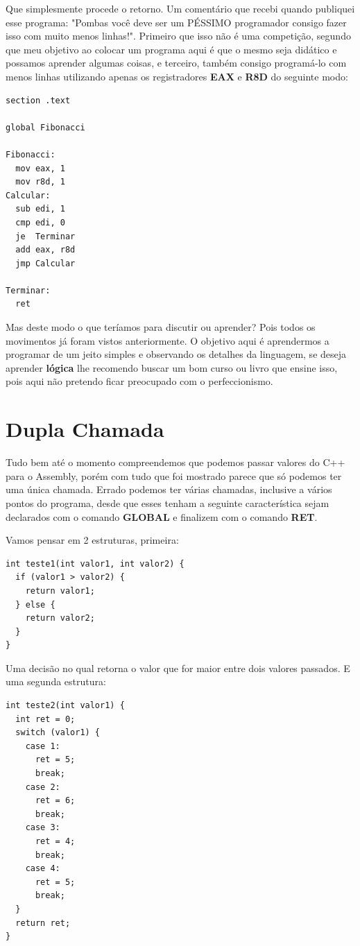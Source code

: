 Que simplesmente procede o retorno. Um comentário que recebi quando publiquei esse programa: "Pombas você deve ser um PÉSSIMO programador consigo fazer isso com muito menos linhas!". Primeiro que isso não é uma competição, segundo que meu objetivo ao colocar um programa aqui é que o mesmo seja didático e possamos aprender algumas coisas, e terceiro, também consigo programá-lo com menos linhas utilizando apenas os registradores \textbf{EAX} e \textbf{R8D} do seguinte modo:
\begin{lstlisting}[]
section .text

global Fibonacci

Fibonacci:
  mov eax, 1
  mov r8d, 1
Calcular:
  sub edi, 1 
  cmp edi, 0
  je  Terminar
  add eax, r8d
  jmp Calcular

Terminar:
  ret
\end{lstlisting}

Mas deste modo o que teríamos para discutir ou aprender? Pois todos os movimentos já foram vistos anteriormente. O objetivo aqui é aprendermos a programar de um jeito simples e observando os detalhes da linguagem, se deseja aprender \textbf{lógica} lhe recomendo buscar um bom curso ou livro que ensine isso, pois aqui não pretendo ficar preocupado com o perfeccionismo.

\section{Dupla Chamada}
Tudo bem até o momento compreendemos que podemos passar valores do C++ para o Assembly, porém com tudo que foi mostrado parece que só podemos ter uma única chamada. Errado podemos ter várias chamadas, inclusive a vários pontos do programa, desde que esses tenham a seguinte característica sejam declarados com o comando \textbf{GLOBAL} e finalizem com o comando \textbf{RET}. 

Vamos pensar em 2 estruturas, primeira:
\begin{lstlisting}[]
int teste1(int valor1, int valor2) {
  if (valor1 > valor2) {
    return valor1;
  } else {
    return valor2;
  }
}
\end{lstlisting}

Uma decisão no qual retorna o valor que for maior entre dois valores passados. E uma segunda estrutura:
\begin{lstlisting}[]
int teste2(int valor1) {
  int ret = 0;
  switch (valor1) {
    case 1:
      ret = 5;
      break;
    case 2:
      ret = 6;
      break;
    case 3:
      ret = 4;
      break;
    case 4:
      ret = 5;
      break;
  }
  return ret;
}
\end{lstlisting}

